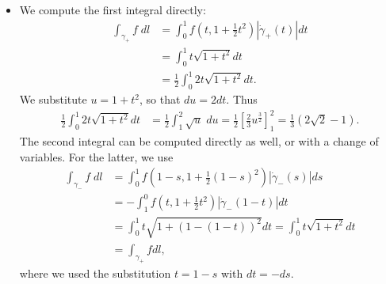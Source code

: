 \documentclass[11pt]{article}
\begin{document}
\begin{solution}
    \begin{itemize}
		\item We compute the first integral directly:
		\begin{align*}
			\int_{\gamma_+} f \;dl
			&=
			\int_{0}^1 f( t, 1 + \frac 1 2 t^2 ) |\dot{\gamma}_+(t)|dt
			\\&
			=
			\int_{0}^1 t \sqrt{ 1 + t^2 } dt
			\\&
			=
			\frac 1 2 \int_{0}^1 2t \sqrt{ 1 + t^2 } dt
			.
		\end{align*}
		We substitute $u = 1 + t^2$, so that $du = 2 dt$. Thus
		\begin{align*}
			\frac 1 2 \int_{0}^1 2t \sqrt{ 1 + t^2 } dt
			&=
			\frac 1 2 \int_1^2 \sqrt{ u } \;du
			=
			\frac 1 2 \left[ \frac 2 3 u^{\frac 3 2} \right]_1^2 = \frac 1 3 \left( 2 \sqrt{2} - 1 \right)
			.
		\end{align*}
		The second integral can be computed directly as well, or with a change of variables. For the latter, we use
		\begin{align*}
			\int_{\gamma_-} f \;dl
			&=
			\int_{0}^1 f( 1 - s, 1 + \frac 1 2 (1 - s)^2 ) |\dot{\gamma}_-(s)|ds
			\\&
			=-\int_1^0 f(t, 1 + \frac 1 2 t^2) |\dot{\gamma}_-(1-t)|dt
			\\&
			= \int_0^1 t \sqrt{1 + (1 - (1 - t))^2} dt = \int_0^1 t \sqrt{1 + t^2} dt
			\\&
			= \int_{\gamma_+}f dl,
		\end{align*}
		where we used the substitution $t = 1 - s$ with $dt = -ds$.


\end{itemize}
\end{solution}
\end{document}
